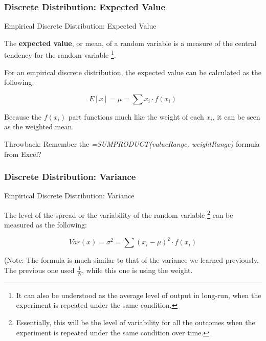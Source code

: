 \documentclass{beamer}
\begin{document}
\subsubsection{Discrete Distribution: Expected Value}
\begin{frame}{Empirical Discrete Distribution: Expected Value}

The \textbf{expected value}, or mean, of a random variable is a measure of the central tendency for the random variable \footnote{It can also be understood as the average level of output in long-run, when the experiment is repeated under the same condition.}. 

\vspace{0.3 cm}
For an empirical discrete distribution, the expected value can be calculated as the following: 

$$ E[x] = \mu = \sum x_i\cdot f(x_i) $$

Because the $f(x_i)$ part functions much like the weight of each $x_i$, it can be seen as the weighted mean. 

\vspace{0.3 cm}
\begin{scriptsize}
Throwback: Remember the \textit{=SUMPRODUCT(valueRange, weightRange)} formula from Excel? 
\end{scriptsize}

\end{frame}


\subsubsection{Discrete Distribution: Variance}

\begin{frame}{Empirical Discrete Distribution: Variance}

The level of the spread or the variability of the random variable \footnote{Essentially, this will be the level of variability for all the outcomes when the experiment is repeated under the same condition over time.} can be measured as the following: 

$$ Var(x) = \sigma^2 = \sum (x_i - \mu)^2 \cdot f(x_i) $$

(Note: The formula is much similar to that of the variance we learned previously. The previous one used $\frac{1}{N}$, while this one is using the weight.


\end{frame}
\end{document}
